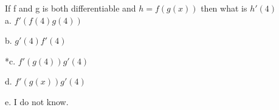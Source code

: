
If f and g is both differentiable and \( h = f(g(x)) \) then what is \( h'(4) \)\\

a. \( f'(f(4)g(4)) \)

b. \( g'(4)f'(4) \)

*c. \( f'(g(4))g'(4) \)

d. \( f'(g(x))g'(4) \)

e. I do not know.\\
